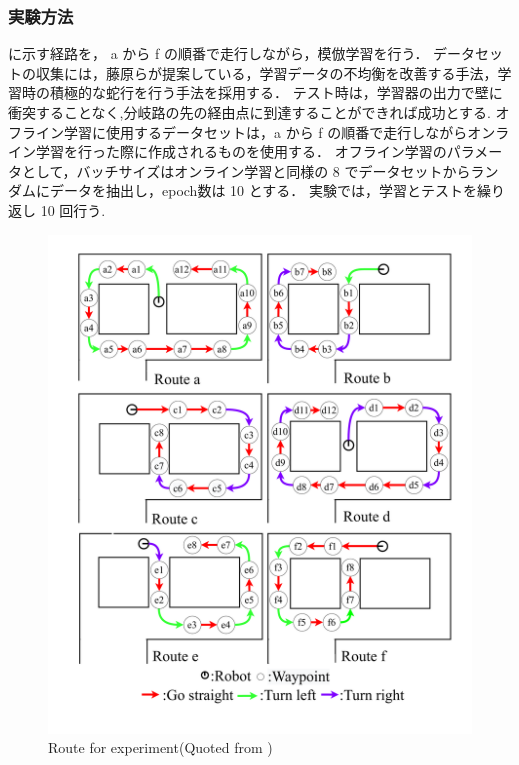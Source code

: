 \newpage
\subsubsection{実験方法}
に示す経路を， a から f の順番で走行しながら，模倣学習を行う．
データセットの収集には，藤原ら\cite{fujiwara2023}が提案している，学習データの不均衡を改善する手法，学習時の積極的な蛇行を行う手法を採用する．
テスト時は，学習器の出力で壁に衝突することなく,分岐路の先の経由点に到達することができれば成功とする.
オフライン学習に使用するデータセットは，a から f の順番で走行しながらオンライン学習を行った際に作成されるものを使用する．
オフライン学習のパラメータとして，バッチサイズはオンライン学習と同様の 8 でデータセットからランダムにデータを抽出し，epoch数は 10 とする．
実験では，学習とテストを繰り返し 10 回行う.

\begin{figure}
  \centering
  \includegraphics[width=130mm]{images/pdf/fujiwara/route.pdf}
  \caption{Route for experiment(Quoted from \cite{fujiwara2023})}
  \label{fig:fujiwara_route}
\end{figure}

\clearpage
